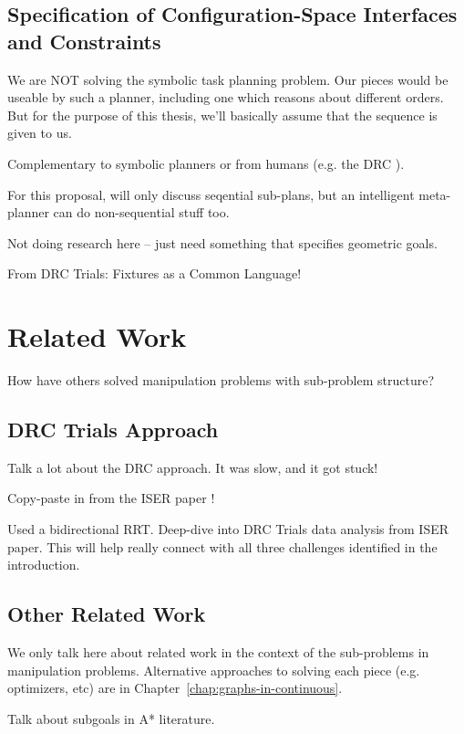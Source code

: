 \subsection{Specification of Configuration-Space Interfaces
   and Constraints}

We are NOT solving the symbolic task planning problem.
Our pieces would be useable by such a planner,
including one which reasons about different orders.
But for the purpose of this thesis,
we'll basically assume that the sequence is given to us.

Complementary to symbolic planners
or from humans (e.g. the DRC \cite{dellin2014drc}).

For this proposal,
will only discuss seqential sub-plans,
but an intelligent meta-planner
can do non-sequential stuff too.

Not doing research here -- just need something that specifies
geometric goals.

From DRC Trials: Fixtures as a Common Language!

\section{Related Work}
\label{sec:subprobs:related}

How have others solved manipulation problems with sub-problem
structure?

\subsection{DRC Trials Approach}

Talk a lot about the DRC approach.
It was slow, and it got stuck!

Copy-paste in from the ISER paper \cite{dellin2014drc}!

Used a bidirectional RRT.
Deep-dive into DRC Trials data analysis from ISER paper.
This will help really connect with all three challenges
identified in the introduction.

\subsection{Other Related Work}

We only talk here about related work
in the context of the sub-problems in manipulation problems.
Alternative approaches to solving each piece
(e.g. optimizers, etc)
are in Chapter~\ref{chap:graphs-in-continuous}.

Talk about subgoals in A* literature.

